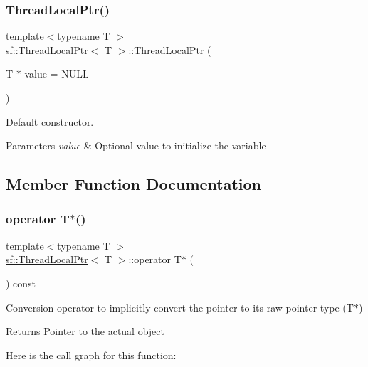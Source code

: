 \subsubsection{\texorpdfstring{Thread\+Local\+Ptr()}{ThreadLocalPtr()}}
{\footnotesize\ttfamily template$<$typename T $>$ \\
\hyperlink{classsf_1_1_thread_local_ptr}{sf\+::\+Thread\+Local\+Ptr}$<$ T $>$\+::\hyperlink{classsf_1_1_thread_local_ptr}{Thread\+Local\+Ptr} (\begin{DoxyParamCaption}\item[{T $\ast$}]{value = {\ttfamily NULL} }\end{DoxyParamCaption})}



Default constructor. 


\begin{DoxyParams}{Parameters}
{\em value} & Optional value to initialize the variable \\
\hline
\end{DoxyParams}


\subsection{Member Function Documentation}
\mbox{\label{classsf_1_1_thread_local_ptr_a81ca089ae5cda72c7470ca93041c3cb2}} 
\subsubsection{\texorpdfstring{operator T$\ast$()}{operator T*()}}
{\footnotesize\ttfamily template$<$typename T $>$ \\
\hyperlink{classsf_1_1_thread_local_ptr}{sf\+::\+Thread\+Local\+Ptr}$<$ T $>$\+::operator T$\ast$ (\begin{DoxyParamCaption}{ }\end{DoxyParamCaption}) const}



Conversion operator to implicitly convert the pointer to its raw pointer type (T$\ast$) 

\begin{DoxyReturn}{Returns}
Pointer to the actual object 
\end{DoxyReturn}
Here is the call graph for this function\+:
\mbox{\label{classsf_1_1_thread_local_ptr_adcbb45ae077df714bf9c61e936d97770}} 
